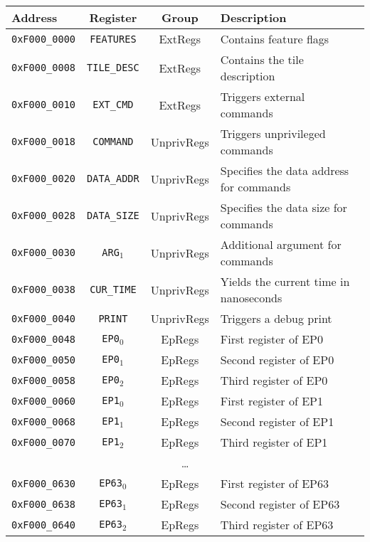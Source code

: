 \vspace{2ex}
\noindent
\begin{tabular}{ p{3cm} | c | c | l }
  \textbf{Address} & \textbf{Register} & \textbf{Group} & \textbf{Description} \\
  \hline
  \hline
  \texttt{0xF000\_0000} & \texttt{FEATURES} & ExtRegs & Contains feature flags \\
  \texttt{0xF000\_0008} & \texttt{TILE\_DESC} & ExtRegs & Contains the tile description \\
  \texttt{0xF000\_0010} & \texttt{EXT\_CMD} & ExtRegs & Triggers external commands \\
  \hline
  \hline
  \texttt{0xF000\_0018} & \texttt{COMMAND} & UnprivRegs & Triggers unprivileged commands \\
  \texttt{0xF000\_0020} & \texttt{DATA\_ADDR} & UnprivRegs & Specifies the data address for commands \\
  \texttt{0xF000\_0028} & \texttt{DATA\_SIZE} & UnprivRegs & Specifies the data size for commands \\
  \texttt{0xF000\_0030} & \texttt{ARG$_1$} & UnprivRegs & Additional argument for commands \\
  \texttt{0xF000\_0038} & \texttt{CUR\_TIME} & UnprivRegs & Yields the current time in nanoseconds \\
  \texttt{0xF000\_0040} & \texttt{PRINT} & UnprivRegs & Triggers a debug print \\
  \hline
  \hline
  \texttt{0xF000\_0048} & \texttt{EP0$_0$} & EpRegs & First register of EP0 \\
  \texttt{0xF000\_0050} & \texttt{EP0$_1$} & EpRegs & Second register of EP0 \\
  \texttt{0xF000\_0058} & \texttt{EP0$_2$} & EpRegs & Third register of EP0 \\
  \hline
  \texttt{0xF000\_0060} & \texttt{EP1$_0$} & EpRegs & First register of EP1 \\
  \texttt{0xF000\_0068} & \texttt{EP1$_1$} & EpRegs & Second register of EP1 \\
  \texttt{0xF000\_0070} & \texttt{EP1$_2$} & EpRegs & Third register of EP1 \\
  \hline
  \multicolumn{4}{c}{\dots} \\
  \hline
  \texttt{0xF000\_0630} & \texttt{EP63$_0$} & EpRegs & First register of EP63 \\
  \texttt{0xF000\_0638} & \texttt{EP63$_1$} & EpRegs & Second register of EP63 \\
  \texttt{0xF000\_0640} & \texttt{EP63$_2$} & EpRegs & Third register of EP63 \\

\end{tabular}
